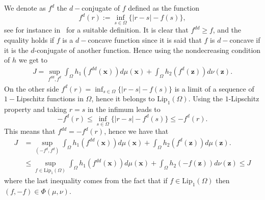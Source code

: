 We denote as $f^d$ the $d-$conjugate of $f$ defined as the function
 $$f^d(r):=\inf_{s\in\Omega}{\{ |r-s|-f(s)\}},$$   see for instance in~\cite{GaMc} for a suitable definition. It is clear that $f^{dd}\geq f$, and the equality holds if $f$ is a $d-$concave function since it is said that $f$ is $d-$concave if it is the $d$-conjugate of another function.  Hence using the nondecreasing condition of $h$ we get to
    \begin{align*}
	J=\sup_{f^{dd},f^d}\int_{\Omega}h_1(f^{dd}({\textbf{x}}))d\mu({\textbf{x}})+\int_{\Omega}h_2(f^{d}({{\textbf{z}}}))d\nu({{\textbf{z}}}).
\end{align*}
On the other side $f^d(r)=\inf_{s\in\Omega}{\{ |r-s|-f(s)\}}$ is a limit of a sequence of $1-$Lipschitz functions in $\Omega$, hence it belongs to $\text{Lip}_1(\Omega)$. Using the $1$-Lipschitz property and taking $r=s$ in the infimum leads to 
$$ -f^d(r)\leq  \inf_{s\in\Omega}{\{ |r-s|-f^d(s)\}}\leq -f^d(r).$$ 
This means that $f^{dd}=-f^d(r)$, hence we have that 
\begin{align*}
	J&=\sup_{(-f^d, f^d)}\int_{\Omega}h_1(f^{dd}({\textbf{x}}))d\mu({\textbf{x}})+\int_{\Omega}h_2(f^{d}({{\textbf{z}}}))d\mu({{\textbf{z}}}).\\
	&\leq \sup_{f\in \text{Lip}_1(\Omega)}\int_{\Omega}h_1(f^{dd}({\textbf{x}}))d\mu({\textbf{x}})+\int_{\Omega}h_2(-f({{\textbf{z}}}))d\nu({{\textbf{z}}})\leq J
\end{align*}
where the last inequality comes from the fact that if $f\in\text{Lip}_1(\Omega)$ then $(f,-f)\in \Phi(\mu, \nu)$.

